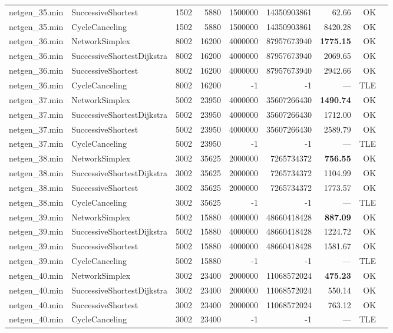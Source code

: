 \begin{longtable}{llrrrrrrl}
netgen\_35.min & SuccessiveShortest & 1502 & 5880 & 1500000 & 14350903861 & 62.66 & OK \\
netgen\_35.min & CycleCanceling & 1502 & 5880 & 1500000 & 14350903861 & 8420.28 & OK \\
\midrule
netgen\_36.min & NetworkSimplex & 8002 & 16200 & 4000000 & 87957673940 & \textbf{1775.15} & OK \\
netgen\_36.min & SuccessiveShortestDijkstra & 8002 & 16200 & 4000000 & 87957673940 & 2069.65 & OK \\
netgen\_36.min & SuccessiveShortest & 8002 & 16200 & 4000000 & 87957673940 & 2942.66 & OK \\
netgen\_36.min & CycleCanceling & 8002 & 16200 & -1 & -1 & --- & TLE \\
\midrule
netgen\_37.min & NetworkSimplex & 5002 & 23950 & 4000000 & 35607266430 & \textbf{1490.74} & OK \\
netgen\_37.min & SuccessiveShortestDijkstra & 5002 & 23950 & 4000000 & 35607266430 & 1712.00 & OK \\
netgen\_37.min & SuccessiveShortest & 5002 & 23950 & 4000000 & 35607266430 & 2589.79 & OK \\
netgen\_37.min & CycleCanceling & 5002 & 23950 & -1 & -1 & --- & TLE \\
\midrule
netgen\_38.min & NetworkSimplex & 3002 & 35625 & 2000000 & 7265734372 & \textbf{756.55} & OK \\
netgen\_38.min & SuccessiveShortestDijkstra & 3002 & 35625 & 2000000 & 7265734372 & 1104.99 & OK \\
netgen\_38.min & SuccessiveShortest & 3002 & 35625 & 2000000 & 7265734372 & 1773.57 & OK \\
netgen\_38.min & CycleCanceling & 3002 & 35625 & -1 & -1 & --- & TLE \\
\midrule
netgen\_39.min & NetworkSimplex & 5002 & 15880 & 4000000 & 48660418428 & \textbf{887.09} & OK \\
netgen\_39.min & SuccessiveShortestDijkstra & 5002 & 15880 & 4000000 & 48660418428 & 1224.72 & OK \\
netgen\_39.min & SuccessiveShortest & 5002 & 15880 & 4000000 & 48660418428 & 1581.67 & OK \\
netgen\_39.min & CycleCanceling & 5002 & 15880 & -1 & -1 & --- & TLE \\
\midrule
netgen\_40.min & NetworkSimplex & 3002 & 23400 & 2000000 & 11068572024 & \textbf{475.23} & OK \\
netgen\_40.min & SuccessiveShortestDijkstra & 3002 & 23400 & 2000000 & 11068572024 & 550.14 & OK \\
netgen\_40.min & SuccessiveShortest & 3002 & 23400 & 2000000 & 11068572024 & 763.12 & OK \\
netgen\_40.min & CycleCanceling & 3002 & 23400 & -1 & -1 & --- & TLE \\
\end{longtable}
\endgroup
